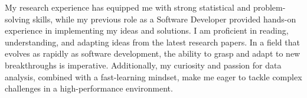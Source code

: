 \documentclass[11pt, a4paper]{awesome-cv}
\begin{document}
\begin{cvletter}
My research experience has equipped me with strong statistical and problem-solving skills, while my previous role as a Software Developer provided hands-on experience in implementing my ideas and solutions. I am proficient in reading, understanding, and adapting ideas from the latest research papers. In a field that evolves as rapidly as software development, the ability to grasp and adapt to new breakthroughs is imperative. Additionally, my curiosity and passion for data analysis, combined with a fast-learning mindset, make me eager to tackle complex challenges in a high-performance environment.

\end{cvletter}


\makeletterclosing
\end{document}
